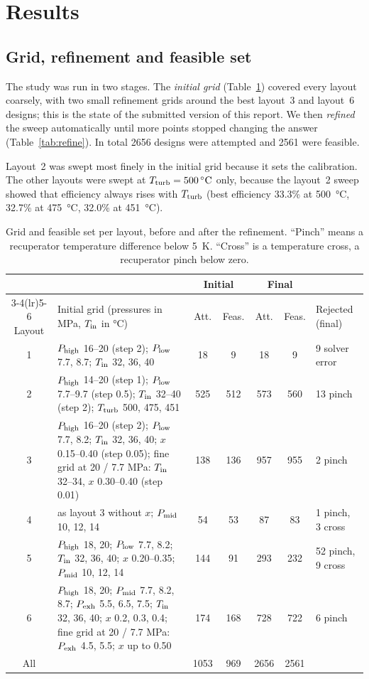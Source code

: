 \section{Results}\label{sec:results}

\subsection{Grid, refinement and feasible set}
The study was run in two stages. The \emph{initial grid} (Table~\ref{tab:grid}) covered every layout coarsely, with two small refinement grids around the best layout~3 and layout~6 designs; this is the state of the submitted version of this report. We then \emph{refined} the sweep automatically until more points stopped changing the answer (Table~\ref{tab:refine}). In total 2656 designs were attempted and 2561 were feasible.

Layout~2 was swept most finely in the initial grid because it sets the calibration. The other layouts were swept at $T_\mathrm{turb} = \SI{500}{\celsius}$ only, because the layout~2 sweep showed that efficiency always rises with $T_\mathrm{turb}$ (best efficiency 33.3\% at \SI{500}{\celsius}, 32.7\% at \SI{475}{\celsius}, 32.0\% at \SI{451}{\celsius}).

\begin{table}[h]\centering\footnotesize
\setlength{\tabcolsep}{3.5pt}
\begin{tabularx}{\textwidth}{@{}c >{\raggedright\arraybackslash}X cc cc l@{}}
\toprule
 & & \multicolumn{2}{c}{Initial} & \multicolumn{2}{c}{Final} & \\
\cmidrule(lr){3-4}\cmidrule(lr){5-6}
Layout & Initial grid (pressures in MPa, $T_\mathrm{in}$ in \si{\celsius}) & Att. & Feas. & Att. & Feas. & Rejected (final)\\
\midrule
1 & $P_\mathrm{high}$ 16--20 (step 2); $P_\mathrm{low}$ 7.7, 8.7; $T_\mathrm{in}$ 32, 36, 40 & 18 & 9 & 18 & 9 & 9 solver error\\
2 & $P_\mathrm{high}$ 14--20 (step 1); $P_\mathrm{low}$ 7.7--9.7 (step 0.5); $T_\mathrm{in}$ 32--40 (step 2); $T_\mathrm{turb}$ 500, 475, 451 & 525 & 512 & 573 & 560 & 13 pinch\\
3 & $P_\mathrm{high}$ 16--20 (step 2); $P_\mathrm{low}$ 7.7, 8.2; $T_\mathrm{in}$ 32, 36, 40; $x$ 0.15--0.40 (step 0.05); fine grid at 20 / 7.7 MPa: $T_\mathrm{in}$ 32--34, $x$ 0.30--0.40 (step 0.01) & 138 & 136 & 957 & 955 & 2 pinch\\
4 & as layout 3 without $x$; $P_\mathrm{mid}$ 10, 12, 14 & 54 & 53 & 87 & 83 & 1 pinch, 3 cross\\
5 & $P_\mathrm{high}$ 18, 20; $P_\mathrm{low}$ 7.7, 8.2; $T_\mathrm{in}$ 32, 36, 40; $x$ 0.20--0.35; $P_\mathrm{mid}$ 10, 12, 14 & 144 & 91 & 293 & 232 & 52 pinch, 9 cross\\
6 & $P_\mathrm{high}$ 18, 20; $P_\mathrm{mid}$ 7.7, 8.2, 8.7; $P_\mathrm{exh}$ 5.5, 6.5, 7.5; $T_\mathrm{in}$ 32, 36, 40; $x$ 0.2, 0.3, 0.4; fine grid at 20 / 7.7 MPa: $P_\mathrm{exh}$ 4.5, 5.5; $x$ up to 0.50 & 174 & 168 & 728 & 722 & 6 pinch\\
\midrule
All & & 1053 & 969 & 2656 & 2561 & \\
\bottomrule
\end{tabularx}
\caption{Grid and feasible set per layout, before and after the refinement. ``Pinch'' means a recuperator temperature difference below \SI{5}{K}. ``Cross'' is a temperature cross, a recuperator pinch below zero.}\label{tab:grid}
\end{table}

